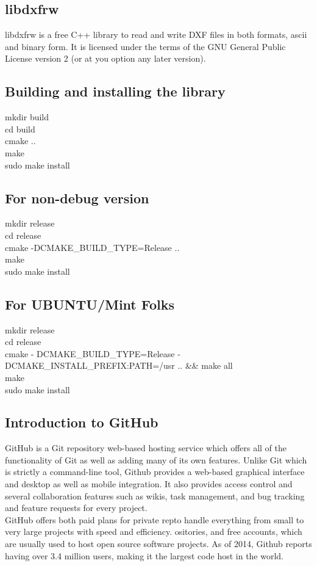 \subsection{libdxfrw}
\noindent libdxfrw is a free C++ library to read and write DXF files in both formats, ascii and binary form. It is licensed under the terms of the GNU General Public License version 2 (or at you option any later version).
\subsection*{Building and installing the library}
mkdir build\\
cd build\\
cmake ..\\
make \\
sudo make install
\subsection*{For non-debug version}
mkdir release\\
cd release\\
cmake -DCMAKE\_BUILD\_TYPE=Release ..\\
make \\
sudo make install
\subsection*{For UBUNTU/Mint Folks}
mkdir release\\
cd release\\
 cmake - DCMAKE\_BUILD\_TYPE=Release -DCMAKE\_INSTALL\_PREFIX:PATH=/usr .. \&\& make all\\
make \\
sudo make install

\subsection{Introduction to GitHub}
\noindent GitHub is a Git repository web-based hosting service which offers all of the functionality of Git as well as adding many of its own features. Unlike Git which is strictly a command-line tool, Github provides a web-based graphical interface and desktop as well as mobile integration. It also provides access control and several collaboration features such as wikis, task management, and bug tracking and feature requests for every project.\\

\noindent GitHub offers both paid plans for private repto handle everything from small to very large projects with speed and efficiency. ositories, and free accounts, which are usually used to host open source software projects. As of 2014, Github reports having over 3.4 million users, making it the largest code host in the world.\\


